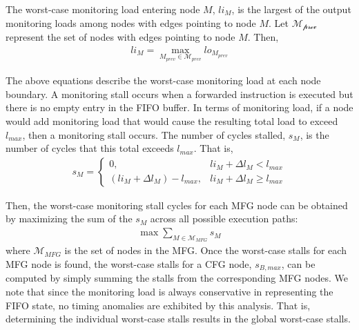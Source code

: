The worst-case monitoring load entering node $M$, $li_{M}$, is the largest of the
output monitoring loads among nodes with edges pointing to node $M$. Let
$\mathcal{M_{\text{prev}}}$ represent the set of nodes with edges pointing to node $M$.
Then,
\begin{align*}
	li_{M} = \max_{M_{prev} \in \mathcal{M}_{prev}}lo_{M_{prev}}
\end{align*}

The above equations describe the worst-case monitoring load at each node boundary.
A monitoring stall occurs when a forwarded instruction is executed 
but there is no empty entry in the FIFO buffer. In terms of monitoring
load, if a node would add monitoring load that would cause the resulting total load
to exceed $l_{max}$, then a monitoring stall occurs. The number of cycles
stalled, $s_{M}$, is the number of cycles that this total exceeds $l_{max}$.
That is,
\begin{align*}
	s_{M} =
		\begin{cases}
			0, &li_{M} + \Delta l_{M} < l_{max} \\
			(li_{M} + \Delta l_{M}) - l_{max}, &li_{M} + \Delta l_M \geq l_{max}
		\end{cases}
\end{align*}

Then, the worst-case monitoring stall cycles for each MFG node can be obtained by maximizing
the sum of the $s_{M}$ across all possible execution paths: 
\begin{align*}
  \max \sum_{M \in \mathcal{M}_{MFG}} s_{M}
\end{align*}
where $\mathcal{M}_{MFG}$ is the set of nodes in the MFG.
Once the worst-case stalls for each MFG node is found, the worst-case stalls for
a CFG node, $s_{B,max}$, can be computed by simply summing the stalls from the corresponding MFG 
nodes. We note that since the monitoring
load is always conservative in representing the FIFO state, no timing anomalies
are exhibited by this analysis. That is, determining the individual worst-case
stalls results in the global worst-case stalls.

